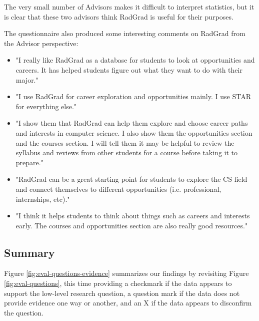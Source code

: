 \documentclass[acmsmall]{acmart}
\begin{document}
The very small number of Advisors makes it difficult to interpret statistics, but it is clear that these two advisors think RadGrad is useful for their purposes.

The questionnaire also produced some interesting comments on RadGrad from the Advisor perspective:

\begin{itemize}[leftmargin=*]
\item "I really like RadGrad as a database for students to look at opportunities and careers. It has helped students figure out what they want to do with their major."
\item "I use RadGrad for career exploration and opportunities mainly. I use STAR for everything else."
\item "I show them that RadGrad can help them explore and choose career paths and interests in computer science. I also show them the opportunities section and the courses section. I will tell them it may be helpful to review the syllabus and reviews from other students for a course before taking it to prepare."
\item "RadGrad can be a great starting point for students to explore the CS field and connect themselves to different opportunities (i.e. professional, internships, etc)."
\item "I think it helps students to think about things such as careers and interests early. The courses and opportunities section are also really good resources."
\end{itemize}


\subsection{Summary}

Figure \ref{fig:eval-questions-evidence} summarizes our findings by revisiting Figure \ref{fig:eval-questions}, this time providing a checkmark if the data appears to support the low-level research question, a question mark if the data does not provide evidence one way or another, and an X if the data appears to disconfirm the question.
\end{document}
